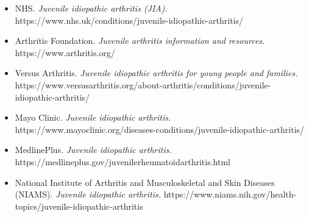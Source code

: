 \begin{itemize}
    \item NHS. \textit{Juvenile idiopathic arthritis (JIA).} https://www.nhs.uk/conditions/juvenile-idiopathic-arthritis/
    \item Arthritis Foundation. \textit{Juvenile arthritis information and resources.} https://www.arthritis.org/
    \item Versus Arthritis. \textit{Juvenile idiopathic arthritis for young people and families.} https://www.versusarthritis.org/about-arthritis/conditions/juvenile-idiopathic-arthritis/
    \item Mayo Clinic. \textit{Juvenile idiopathic arthritis.} https://www.mayoclinic.org/diseases-conditions/juvenile-idiopathic-arthritis/
    \item MedlinePlus. \textit{Juvenile idiopathic arthritis.} https://medlineplus.gov/juvenilerheumatoidarthritis.html
    \item National Institute of Arthritis and Musculoskeletal and Skin Diseases (NIAMS). \textit{Juvenile idiopathic arthritis.} https://www.niams.nih.gov/health-topics/juvenile-idiopathic-arthritis
\end{itemize}
